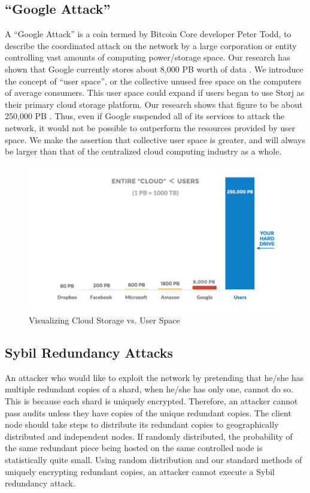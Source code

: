 \documentclass[a4paper,10pt]{article}
\begin{document}
\subsection{``Google Attack''}
A “Google Attack” is a coin termed by Bitcoin Core developer Peter Todd, to describe the coordinated attack on the network by a large corporation or entity controlling vast amounts of computing power/storage space. Our research has shown that Google currently stores about 8,000 PB worth of data \cite{15}. We introduce the concept of “user space”, or the collective unused free space on the computers of average consumers. This user space could expand if users began to use Storj as their primary cloud storage platform. Our research shows that figure to be about 250,000 PB \cite{15}. Thus, even if Google suspended all of its services to attack the network, it would not be possible to outperform the resources provided by user space. We make the assertion that collective user space is greater, and will always be larger than that of the centralized cloud computing industry as a whole.

\begin{figure}[h!]
\centering
\includegraphics[width=\linewidth]{8}
\caption{Visualizing Cloud Storage vs. User Space }
\end{figure}

\subsection{Sybil Redundancy Attacks}
An attacker who would like to exploit the network by pretending that he/she has multiple redundant copies of a shard, when he/she has only one, cannot do so. This is because each shard is uniquely encrypted. Therefore, an attacker cannot pass audits unless they have copies of the unique redundant copies. The client node should take steps to distribute its redundant copies to geographically distributed and independent nodes. If randomly distributed, the probability of the same redundant piece being hosted on the same controlled node is statistically quite small. Using random distribution and our standard methods of uniquely encrypting redundant copies, an attacker cannot execute a Sybil redundancy attack.   
\end{document}
